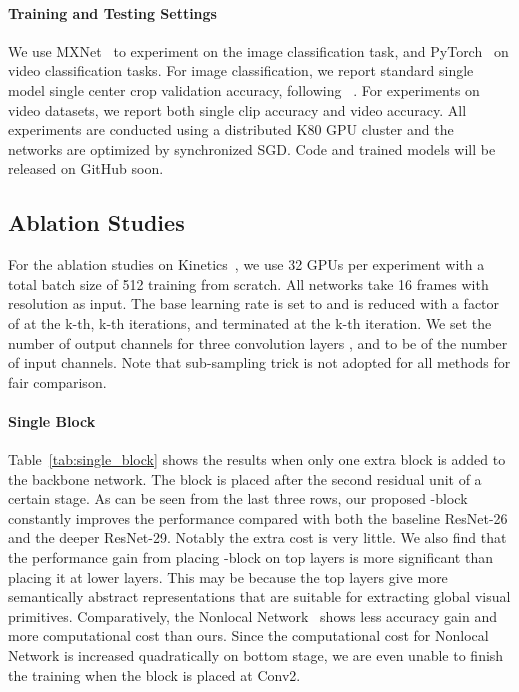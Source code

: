 \documentclass{article}
\begin{document}
\paragraph{Training and Testing Settings}
We use MXNet~\cite{chen2015mxnet} to experiment on the image classification task, and PyTorch~\cite{paszke2017pytorch} on video classification tasks. For  image classification, we report standard single model single  center crop validation accuracy,  following ~\cite{he2016deep,he2016identity}. For experiments on video datasets, we report both single clip accuracy and video accuracy.
All experiments are conducted using a distributed K80 GPU cluster and the networks are optimized by synchronized SGD. Code and trained models will be released on GitHub soon.


\subsection{Ablation Studies}

For the ablation studies on Kinetics~\cite{carreira2017quo}, we use 32 GPUs per experiment with a total batch size of 512 training from scratch. All networks take 16 frames with resolution  as input. The base learning rate is set to  and is reduced with a factor of  at the k-th, k-th iterations, and terminated at the k-th iteration. We set the number of output channels for three convolution layers ,  and  to be  of the number of input channels. Note that sub-sampling trick is not adopted for all methods for fair comparison.

\vspace{-2mm}
\paragraph{Single Block}
Table~\ref{tab:single_block} shows the results when only one extra block is added to the backbone network. The block is placed after the second residual unit of a certain stage. As can be seen  from the last three rows, our proposed -block constantly improves the performance compared with both the baseline ResNet-26 and the deeper ResNet-29. Notably the  extra cost is very little. We also find that  the performance gain from placing  -block on top layers is more significant than placing it at  lower layers. This may be because the top layers give  more  semantically abstract representations that are  suitable for extracting global visual primitives. Comparatively, the Nonlocal Network~\cite{wang17non} shows less accuracy gain and more computational cost than ours. Since the computational cost for Nonlocal Network is increased quadratically on bottom stage, we are even unable to finish the training when the block is placed at Conv2.
\end{document}
